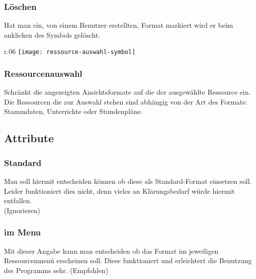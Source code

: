 \subsubsection{Löschen}

\vspace{10pt}

\noindent
Hat man ein, von einem Benutzer erstellten, Format markiert wird er beim anklicken des Symbols gelöscht.\\

\begin{wrapfigure}{r}{.06\textwidth}
	\vspace{-14pt}
	\texttt{[image: ressource-auswahl-symbol]}
	\vspace{-40pt}
\end{wrapfigure}

\subsubsection{Ressourcenauswahl}

\vspace{10pt}

\noindent
Schränkt die angezeigten Ansichtsformate auf die der ausgewählte Ressource ein. Die Ressourcen die zur Auswahl stehen sind abhängig von der Art des Formats: Stammdaten, Unterrichte oder Stundenpläne.\\ 

\subsection{Attribute}

\subsubsection{Standard}
Man soll hiermit entscheiden können ob diese als Standard-Format einsetzen soll. Leider funktioniert dies nicht, denn vieles an Klärungsbedarf würde hiermit entfallen.\\ (Ignorieren)

\subsubsection{im Menu}
Mit dieser Angabe kann man entscheiden ob das Format im jeweiligen Ressourcenmenü erscheinen soll. Diese funktioniert und erleichtert die Benutzung des Programms sehr. (Empfohlen)\\


